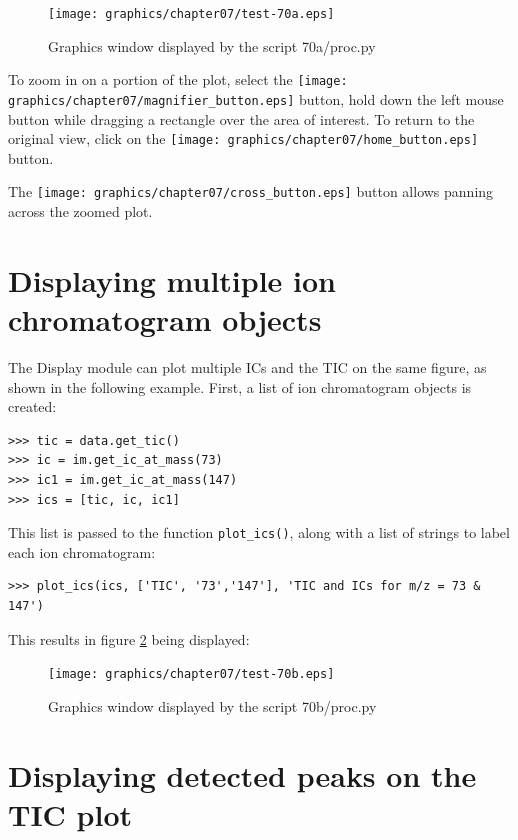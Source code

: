 \begin{figure}
  \begin{center}
    \texttt{[image: graphics/chapter07/test-70a.eps]}
  \end{center}
  \caption{Graphics window displayed by the script 70a/proc.py}
  \label{fig:70a}
\end{figure}

To zoom in on a portion of the plot, select the
\texttt{[image: graphics/chapter07/magnifier\_button.eps]}
button, hold down the left mouse button while dragging a rectangle over
the area of interest. To return to the original view, click on the
\texttt{[image: graphics/chapter07/home\_button.eps]} button.

The 
\texttt{[image: graphics/chapter07/cross\_button.eps]}
button allows panning across the zoomed plot. 

\section{Displaying multiple ion chromatogram objects}


The Display module can plot multiple ICs and the TIC on the same figure,
as shown in the following example. First, a list of ion chromatogram
objects is created:

\begin{verbatim}
>>> tic = data.get_tic()
>>> ic = im.get_ic_at_mass(73)
>>> ic1 = im.get_ic_at_mass(147)
>>> ics = [tic, ic, ic1]
\end{verbatim}

This list is passed to the function {\tt plot\_ics()}, along with a list
of strings to label each ion chromatogram:

\begin{verbatim}
>>> plot_ics(ics, ['TIC', '73','147'], 'TIC and ICs for m/z = 73 & 147')
\end{verbatim}

This results in figure \ref{fig:70b} being displayed:

\begin{figure}
  \begin{center}
    \texttt{[image: graphics/chapter07/test-70b.eps]}
  \end{center}
  \caption{Graphics window displayed by the script 70b/proc.py}
  \label{fig:70b}
\end{figure}

\section{Displaying detected peaks on the TIC plot}

